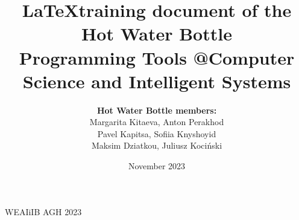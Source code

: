 \documentclass{article}
\date{November 2023}
\begin{document}
\author{ \textbf{Hot Water Bottle members:}
    \\
    Margarita Kitaeva, Anton Perakhod \\ Pavel Kapitsa, Sofiia Knyshoyid \\ Maksim Dziatkou, Juliusz Kociński}

\title{%
  \LaTeX  training document of the Hot Water Bottle\\
  \large Programming Tools @Computer Science and Intelligent Systems}


\maketitle
\vfill

\begin{center}
    \textcopyright WEAIiIB AGH 2023
\end{center}

\newpage

\newpage

\newpage

\newpage

\newpage

\newpage

\end{document}
